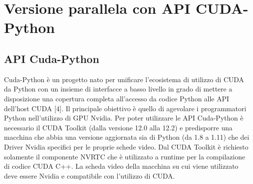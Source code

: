 \documentclass[12pt,a4paper]{report}
\begin{document}
\chapter{Versione parallela con API CUDA-Python} 

\section{API Cuda-Python}
Cuda-Python è un progetto nato per unificare l'ecosistema di utilizzo di CUDA da Python con un insieme di interfacce a basso livello in grado di mettere a disposizione una copertura completa all'accesso da codice Python alle API dell'host CUDA [4]. Il principale obiettivo è quello di agevolare i programmatori Python nell'utilizzo di GPU Nvidia. \newline \newline
Per poter utilizzare le API Cuda-Python è necessario il CUDA Toolkit (dalla versione 12.0 alla 12.2) e predisporre una macchina che abbia una versione aggiornata sia di Python (da 1.8 a 1.11) che dei Driver Nvidia specifici per le proprie schede video. \newline
Dal CUDA Toolkit è richiesto solamente il componente NVRTC che è utilizzato a runtime per la compilazione di codice CUDA C++. \newline
La scheda video della macchina su cui viene utilizzato deve essere Nvidia e compatibile con l'utilizzo di CUDA.
\end{document}

